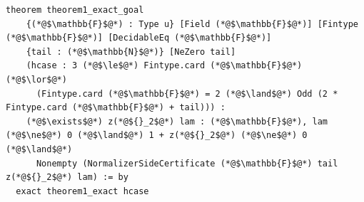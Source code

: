\begin{lstlisting}[style=leancode]
theorem theorem1_exact_goal
    {(*@$\mathbb{F}$@*) : Type u} [Field (*@$\mathbb{F}$@*)] [Fintype (*@$\mathbb{F}$@*)] [DecidableEq (*@$\mathbb{F}$@*)]
    {tail : (*@$\mathbb{N}$@*)} [NeZero tail]
    (hcase : 3 (*@$\le$@*) Fintype.card (*@$\mathbb{F}$@*) (*@$\lor$@*)
      (Fintype.card (*@$\mathbb{F}$@*) = 2 (*@$\land$@*) Odd (2 * Fintype.card (*@$\mathbb{F}$@*) + tail))) :
    (*@$\exists$@*) z(*@${}_2$@*) lam : (*@$\mathbb{F}$@*), lam (*@$\ne$@*) 0 (*@$\land$@*) 1 + z(*@${}_2$@*) (*@$\ne$@*) 0 (*@$\land$@*)
      Nonempty (NormalizerSideCertificate (*@$\mathbb{F}$@*) tail z(*@${}_2$@*) lam) := by
  exact theorem1_exact hcase
\end{lstlisting}
